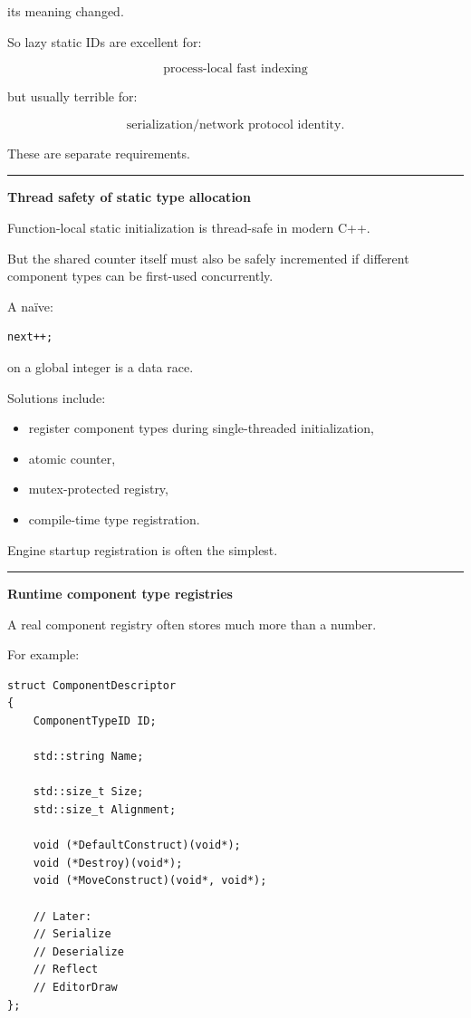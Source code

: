 its meaning changed.

So lazy static IDs are excellent for:

\[
\boxed{\text{process-local fast indexing}}
\]

but usually terrible for:

\[
\boxed{\text{serialization/network protocol identity}}.
\]

These are separate requirements.

\begin{center}\rule{0.5\linewidth}{0.5pt}\end{center}

\textbf{Thread safety of static type allocation}

Function-local static initialization is thread-safe in modern C++.

But the shared counter itself must also be safely incremented if different component types can be first-used concurrently.

A naïve:

\begin{verbatim}
next++;
\end{verbatim}

on a global integer is a data race.

Solutions include:

\begin{itemize}
\tightlist
\item
  register component types during single-threaded initialization,
\item
  atomic counter,
\item
  mutex-protected registry,
\item
  compile-time type registration.
\end{itemize}

Engine startup registration is often the simplest.

\begin{center}\rule{0.5\linewidth}{0.5pt}\end{center}

\textbf{Runtime component type registries}

A real component registry often stores much more than a number.

For example:

\begin{verbatim}
struct ComponentDescriptor
{
    ComponentTypeID ID;

    std::string Name;

    std::size_t Size;
    std::size_t Alignment;

    void (*DefaultConstruct)(void*);
    void (*Destroy)(void*);
    void (*MoveConstruct)(void*, void*);

    // Later:
    // Serialize
    // Deserialize
    // Reflect
    // EditorDraw
};
\end{verbatim}

